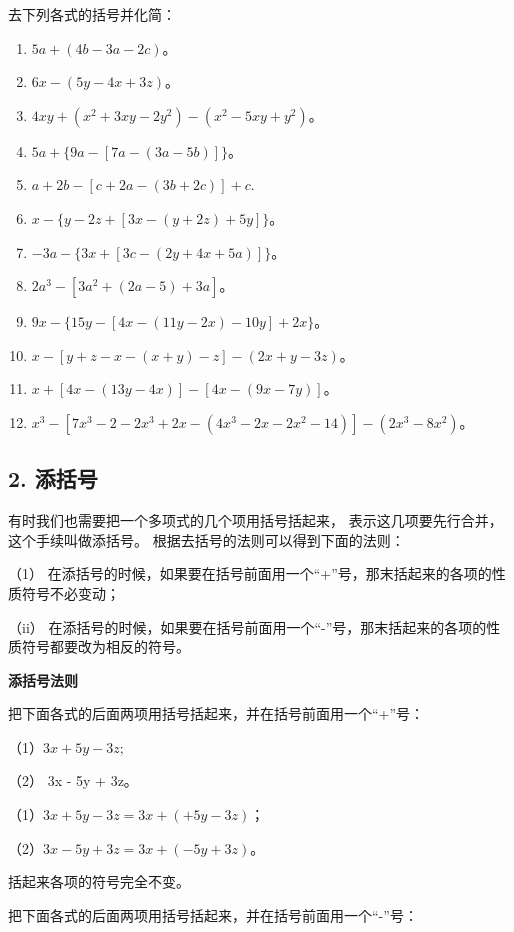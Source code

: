 去下列各式的括号并化简：

\begin{enumerate}[start=1]
\item
  \(5a + (4b - 3a - 2c)\)。
\item
  \(6x-(5y-4x+3z)\)。
\item
  \(4xy + (x^{2} + 3xy - 2y^{2}) - (x^{2} - 5xy + y^{2})\)。
\item
  \(5a + \{9a - [7a - (3a - 5b)]\}\)。
\item
  \(a + 2b - [c + 2a - (3b + 2c)] + c.\)
\item
  \(x - \{y - 2z + [3x - (y + 2z) + 5y]\}\)。
\item
  \(-3a-\{3x+[3c-(2y+4x+5a)]\}\)。
\item
  \(2a^{3}-[3a^{2}+(2a-5)+3a]\)。
\item
  \(9x - \{15y - [4x - (11y - 2x) - 10y] + 2x\}\)。
\item
  \(x - [y + z - x - (x + y) - z] - (2x + y - 3z)\)。
\item
  \(x + [4x - (13y - 4x)] - [4x - (9x - 7y)]\)。
\item
  \(x^{3} - [7x^{3} - 2 - 2x^{3} + 2x - (4x^{3} - 2x - 2x^{2} - 14)] - (2x^{3} - 8x^{2})\)。
\end{enumerate}

\subsection{2. 添括号}

有时我们也需要把一个多项式的几个项用括号括起来， 表示这几项要先行合并，
这个手续叫做添括号。 根据去括号的法则可以得到下面的法则：

（1）
在添括号的时候，如果要在括号前面用一个``+''号，那末括起来的各项的性质符号不必变动；

（ii）
在添括号的时候，如果要在括号前面用一个``-''号，那末括起来的各项的性质符号都要改为相反的符号。

\textbf{添括号法则}

把下面各式的后面两项用括号括起来，并在括号前面用一个``+''号：

（1）\(3x + 5y - 3z;\)

（2） 3x - 5y + 3z。

 （1）\(3x + 5y - 3z = 3x + (+5y - 3z)\)；

（2）\(3x - 5y + 3z = 3x + (-5y + 3z)\)。

 括起来各项的符号完全不变。

把下面各式的后面两项用括号括起来，并在括号前面用一个``-''号：

